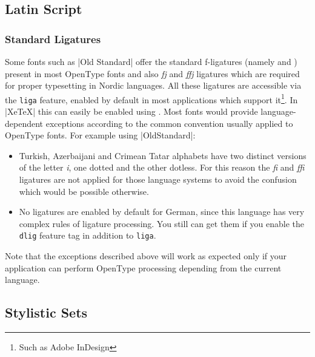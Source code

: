 \subsection{Latin Script}

\subsubsection{Standard Ligatures}

Some fonts such as |Old Standard| offer the standard f-ligatures (namely  and ) present in most OpenType fonts and also
\textit{fj} and \textit{ffj} ligatures which are required for proper
typesetting in Nordic languages. All these ligatures are accessible via the
\texttt{liga} feature, enabled by default in most applications which
support it\footnote{Such as Adobe InDesign}. In |XeTeX| this can easily be enabled using \cmd{\fontspec}\oarg[Ligatures=Common]. Most fonts would provide language-dependent exceptions according to the common convention usually
applied to OpenType fonts. For example using |OldStandard|:

\begin{itemize}
\item Turkish, Azerbaijani and Crimean Tatar alphabets have two distinct
versions of the letter \textit{i}, one dotted and the other dotless. For
this reason the \textit{fi} and \textit{ffi} ligatures are not applied for
those language systems to avoid the confusion which would be possible
otherwise.

\item No ligatures are enabled by default for German, since this language
has very complex rules of ligature processing. You still can get them if
you enable the \texttt{dlig} feature tag in addition to \texttt{liga}.

\end{itemize}

Note that the exceptions described above will work as expected only if your
application can perform OpenType processing depending from the current
language.


\subsection{Stylistic Sets}

